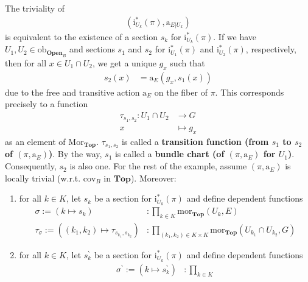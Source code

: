 \begin{exa}[Bundles 2]
The triviality of
\begin{align*}
  \left(
    \mathrm{i}_{U_{k}}^{\ast}(\pi),
    \mathrm{a}_{E \vert U_{k}}
  \right)
\end{align*}
is equivalent to the existence of a section $s_{k}$ for $\mathrm{i}_{U_{k}}^{\ast}(\pi)$.
If we have $U_{1},U_{2} \in \mathrm{ob}_{\mathbf{Open}_{B}}$ and sections $s_{1}$ and $s_{2}$ for $\mathrm{i}_{U_{1}}^{\ast}(\pi)$ and $\mathrm{i}_{U_{2}}^{\ast}(\pi)$, respectively, then for all $x \in U_{1} \cap U_{2}$, we get a unique $g_{x}$ such that
\begin{align*}
  s_{2}(x)
  &=
  \mathrm{a}_{E}
  \left(
    g_{x},
    s_{1}(x)
  \right)
\end{align*}
due to the free and transitive action $\mathrm{a}_{E}$ on the fiber of $\pi$.
This corresponds precisely to a function
\begin{align*}
  \tau_{s_{1},s_{2}}
  \colon
  U_{1}
  \cap
  U_{2}
  &\rightarrow
  G
  \\
  x
  &\mapsto
  g_{x}
\end{align*}
as an element of $\mathrm{Mor}_{\mathbf{Top}}$.
$\tau_{s_{1},s_{2}}$ is called a \textbf{transition function (from $s_{1}$ to $s_{2}$ of $(\pi,\mathrm{a}_{E})$)}.
By the way, $s_{1}$ is called a \textbf{bundle chart (of $(\pi,\mathrm{a}_{E})$ for $U_{1}$)}.
Consequently, $s_{2}$ is also one.
For the rest of the example, assume $(\pi,\mathrm{a}_{E})$ is locally trivial (w.r.t. $\mathrm{cov}_{B}$ in $\mathbf{Top}$).
Moreover:
\begin{enumerate}
\item[$\bullet$]
for all $k \in K$, let $s_{k}$ be a section for $\mathrm{i}_{U_{k}}^{\ast}(\pi)$ and define dependent functions
\begin{align*}
  \sigma
  :=
  \left(
    k
    \mapsto
    s_{k}
  \right)
  &\colon
  \prod_{k \in K}
  \mathrm{mor}_{\mathbf{Top}}(U_{k},E)
  \\
  \tau_{\sigma}
  :=
  \left(
    (k_{1},k_{2})
    \mapsto
    \tau_{s_{k_{1}},s_{k_{2}}}
  \right)
  &\colon
  \prod_{(k_{1},k_{2}) \in K \times K}
  \mathrm{mor}_{\mathbf{Top}}(U_{k_{1}} \cap U_{k_{2}},G)
\end{align*}
\item[$\bullet$]
for all $k \in K$, let $s_{k}^{\backprime}$ be a section for $\mathrm{i}_{U_{k}}^{\ast}(\pi)$ and define dependent functions
\begin{align*}
  \sigma^{\backprime}
  :=
  \left(
    k
    \mapsto
    s_{k}^{\backprime}
  \right)
  &\colon
  \prod_{k \in K}

\end{align*}
\end{enumerate}
\end{exa}
